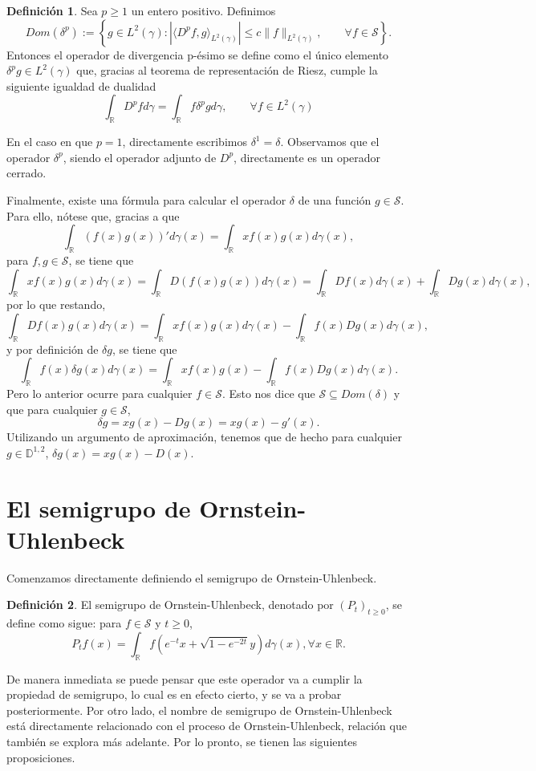 \documentclass[letterpaper,twoside]{book}
\newcommand{\R}{\mathbb{R}}
\newcommand{\1}{\mathds{1}}
\newcommand{\abs}[1]{\left\lvert #1 \right\rvert}
\theoremstyle{definition}
\newtheorem{dfn}{Definición}
\theoremstyle{definition}
\theoremstyle{definition}
\theoremstyle{definition}
\theoremstyle{definition}
\theoremstyle{definition}
\theoremstyle{definition}
\begin{document}
 \begin{dfn}
    Sea $p\geq1$ un entero positivo. Definimos $$Dom(\delta^p):=\left\{g\in L^2(\gamma): \abs{\langle D^{p}f,g\rangle_{L^2(\gamma)}}\leq c\|f\|_{L^2(\gamma)}, \qquad \forall f\in \mathcal{S}\right\}.$$ 
    Entonces el operador de divergencia p-ésimo se define como el único elemento $\delta^{p} g\in L^2(\gamma)$ que, gracias al teorema de representación de Riesz, cumple la siguiente igualdad de dualidad
    \[
        \int_\R D^{p}fd\gamma=\int_\R f\delta^{p}gd\gamma, \qquad \forall f\in L^2(\gamma)  
       \]
 \end{dfn}
 En el caso en que $p=1$, directamente escribimos $\delta^1=\delta$. Observamos que el operador $\delta^p$, siendo el operador adjunto de $D^{p}$, directamente es un operador cerrado.

Finalmente, existe una fórmula para calcular el operador $\delta$ de una función $g\in \mathcal{S}$. Para ello, nótese que, gracias a que 
\[
\int_\R (f(x)g(x))'d\gamma(x)=\int_\R xf(x)g(x)d\gamma(x), 
\]
para $f,g\in \mathcal{S}$, se tiene que 
\[
    \int_\R xf(x)g(x)d\gamma(x)=\int_\R D \left(f(x)g(x)\right) d\gamma(x)=\int_\R Df(x)d\gamma(x) +\int_\R Dg(x)d\gamma(x),
\]
por lo que restando, 
\[
    \int_\R Df(x)g(x)d\gamma(x)=\int_\R xf(x)g(x)d\gamma(x)-\int_\R f(x)Dg(x)d\gamma(x),
\]
y por definición de $\delta g$, se tiene que 
\[
\int_\R f(x)\delta g(x)d\gamma(x)=\int_\R xf(x)g(x)-\int_\R f(x)Dg(x)d\gamma(x).   
\]
Pero lo anterior ocurre para cualquier $f\in \mathcal{S}$. Esto nos dice que $\mathcal{S}\subseteq Dom(\delta)$ y que para cualquier $g\in \mathcal{S}$, 
\[
\delta g=xg(x)-Dg(x)=xg(x)-g'(x).    
\]
Utilizando un argumento de aproximación, tenemos que de hecho para cualquier $g\in \mathbb{D}^{1,2}$, $\delta g(x)=xg(x)-D(x)$.

\section{El semigrupo de Ornstein-Uhlenbeck}
Comenzamos directamente definiendo el semigrupo de Ornstein-Uhlenbeck. 
\begin{dfn}
    El semigrupo de Ornstein-Uhlenbeck, denotado por $(P_t)_{t\geq0}$, se define como sigue: para $f\in \mathcal{S}$ y $t\geq0$,
    \[
    P_tf(x)=\int_\R f\left(e^{-t}x+\sqrt{1-e^{-2t}}y\right)d\gamma(x), \forall x\in \R.
    \]
\end{dfn}
De manera inmediata se puede pensar que este operador va a cumplir la propiedad de semigrupo, lo cual es en efecto cierto, y se va a probar posteriormente. Por otro lado, el nombre de semigrupo de Ornstein-Uhlenbeck está directamente relacionado con el proceso de Ornstein-Uhlenbeck, relación que también se explora más adelante. Por lo pronto, se tienen las siguientes proposiciones.
\end{document}
